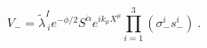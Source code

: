 \begin{equation}
V_- = \tilde \lambda^I_{\ i}
e^{-\phi/2} S^{\dot \alpha} e^{ik_\mu X^\mu}
\prod_{i=1}^3 (\sigma_-^i s_-^i)
\ .\end{equation}

